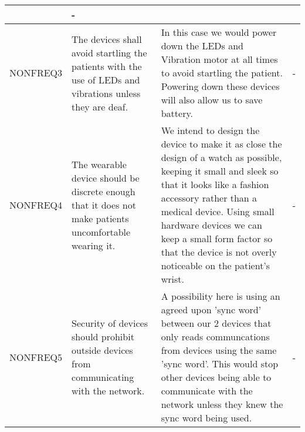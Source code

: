 \begin{xltabular}[H]{\textwidth}{c | X | X | X}
        &

        -\\

        \midrule

        NONFREQ3

        &

        The devices shall avoid startling the patients with the use of LEDs and vibrations unless they are deaf.

        &

        In this case we would power down the LEDs and Vibration motor at all times to avoid startling the patient. Powering down these devices will also allow us to save battery.

        &

        -\\

        \midrule

        NONFREQ4

        &

        The wearable device should be discrete enough that it does not make patients uncomfortable wearing it.

        &

        We intend to design the device to make it as close the design of a watch as possible, keeping it small and sleek so that it looks like a fashion accessory rather than a medical device. Using small hardware devices we can keep a small form factor so that the device is not overly noticeable on the patient's wrist.

        &

        -\\

        \midrule

        NONFREQ5

        &

        Security of devices should prohibit outside devices from communicating with the network.

        &

        A possibility here is using an agreed upon 'sync word' between our 2 devices that only reads communcations from devices using the same 'sync word'. This would stop other devices being able to communicate with the network unless they knew the sync word being used.

        &

        -\\

		\midrule


\end{xltabular}
